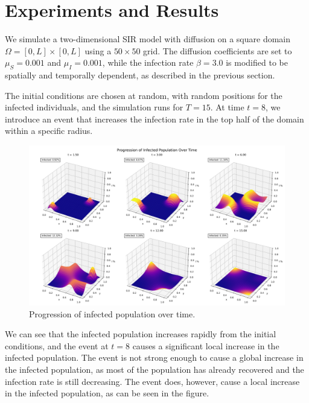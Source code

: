 \section{Experiments and Results}

We simulate a two-dimensional SIR model with diffusion on a square domain \(\Omega = [0,L]\times [0,L]\) using a \(50\times 50\) grid.
The diffusion coefficients are set to \(\mu_S = 0.001\) and \(\mu_I = 0.001\), while the infection rate \(\beta=3.0\) is modified to be spatially and temporally dependent, as described in the previous section.

The initial conditions are chosen at random, with random positions for the infected individuals, and the simulation runs for \(T=15\).
At time \(t=8\), we introduce an event that increases the infection rate in the top half of the domain within a specific radius.

\begin{figure}[H]
  \centering
  \includegraphics[width=1.0\textwidth]{figures/infected_progression.png}
  \caption{Progression of infected population over time.}
  \label{fig:infected_progression}
\end{figure}

We can see that the infected population increases rapidly from the initial conditions, and the event at \(t=8\) causes a significant local increase in the infected population.
The event is not strong enough to cause a global increase in the infected population, as most of the population has already recovered and the infection rate is still decreasing.
The event does, however, cause a local increase in the infected population, as can be seen in the figure.